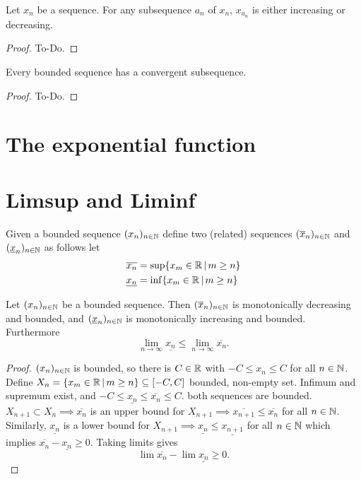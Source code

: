 \begin{lemma}\label{lem:subseqmonoincordec}
    Let $x_n$ be a sequence.
    For any subsequence $a_n$ of $x_n$,
    $x_{a_n}$ is either increasing or decreasing.
\end{lemma}
\begin{proof}
    To-Do.
\end{proof}

\begin{theorem}\label{thm:seq_bolzanoweierstrass}
     \leanok
    Every bounded sequence has a convergent subsequence.
\end{theorem}
\begin{proof}
    To-Do.
\end{proof}

\section{The exponential function}

\section{Limsup and Liminf}
Given a bounded sequence $\seq$ define two
(related)
sequences $\seq[\overline{x}]$ and $\seq[\underline{x}]$ as follows let
\begin{align*}
    \overline{x_n} &= \sup\{x_m \in \R\,|\,m \geq n\} \\
    \underline{x_n} &= \inf\{x_m \in \R\,|\,m \geq n\}
\end{align*}

\begin{lemma}\label{lem:limsup_liminf}
    Let $\seq$ be a bounded sequence.
    Then $\seq[\overline{x}]$ is monotonically decreasing and bounded,
    and $\seq[\underline{x}]$ is monotonically increasing and bounded.
    Furthermore
    \[
    \lim_{n \to \infty}\underline{x_n} \leq \lim_{n \to \infty}\overline{x_n}.
    \]
\end{lemma}
\begin{proof}
    $\seq$ is bounded,
    so there is $C \in \R$ with $-C \leq x_n \leq C$ for all $n \in \N$.
    Define $X_n = \{x_m \in \R\,|\, m \geq n\} \subseteq [-C, C]$ bounded,
    non-empty set.
    Infimum and supremum exist,
    and $-C \leq \underline{x_n} \leq \overline{x_n} \leq C$.
    both sequences are bounded.
    $X_{n + 1} \subset X_n \implies \overline{x_n}$ is an upper bound for $X_{n + 1} \implies \overline{x_{n + 1}} \leq \overline{x_n}$ for all $n \in \N$.
    Similarly,
    $\underline{x_n}$ is a lower bound for $X_{n + 1} \implies \underline{x_n} \leq \underline{x_{n + 1}}$ for all $n \in \N$ which implies $\overline{x_n} - \underline{x_n} \geq 0$.
    Taking limits gives
    \[
    \lim\overline{x_n} - \lim\underline{x_n} \geq 0.
    \]
\end{proof}

